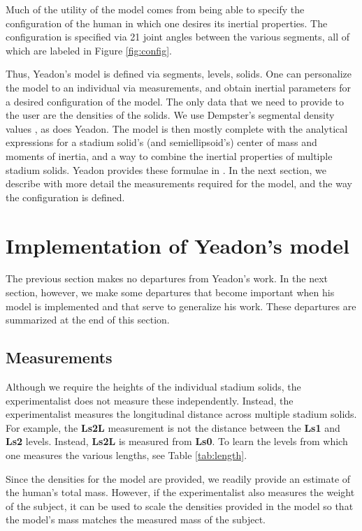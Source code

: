 \documentclass[10pt]{article}
\begin{document}
Much of the utility of the model comes from being able to specify the
configuration of the human in which one desires its inertial properties. The
configuration is specified via 21 joint angles between the various segments,
all of which are labeled in Figure \ref{fig:config}.

Thus, Yeadon's model is defined via segments, levels, solids. One can
personalize the model to an individual via measurements, and obtain inertial
parameters for a desired configuration of the model. The only data that we need
to provide to the user are the densities of the solids. We use Dempster's
segmental density values \cite{Dempster1955}, as does Yeadon. The model is then
mostly complete with the analytical expressions for a stadium solid's (and semiellipsoid's) center of
mass and moments of inertia, and a way to combine the inertial properties of
multiple stadium solids. Yeadon provides these formulae in \cite{Yeadon1990f}.
In the next section, we describe with more detail the measurements required for
the model, and the way the configuration is defined.

\section*{Implementation of Yeadon's model}

The previous section makes no departures from Yeadon's work. In the next
section, however, we make some departures that become important when his model
is implemented and that serve to generalize his work. These departures are
summarized at the end of this section.

\subsection*{Measurements}

Although we require the heights of the individual stadium solids, the
experimentalist does not measure these independently. Instead, the
experimentalist measures the longitudinal distance across multiple stadium
solids. For example, the \textbf{Ls2L} measurement is not the distance between
the \textbf{Ls1} and \textbf{Ls2} levels. Instead, \textbf{Ls2L} is measured
from \textbf{Ls0}. To learn the levels from which one measures the various
lengths, see Table \ref{tab:length}.

Since the densities for the model are provided, we readily provide an estimate
of the human's total mass. However, if the experimentalist also measures the
weight of the subject, it can be used to scale the densities provided in the
model so that the model's mass matches the measured mass of the subject.
\end{document}
